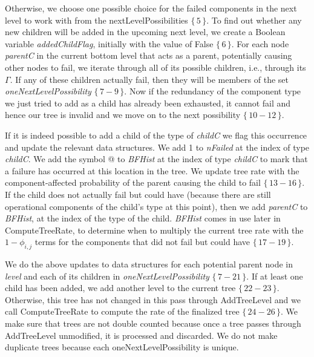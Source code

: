 \documentclass[12pt]{article}
\newcommand{\citeLine}[1]{$\{\,#1\,\}$}
\newcommand{\citeBlock}[2]{$\{\,#1 - #2\,\}$}
\begin{document}
 Otherwise, we choose one possible choice for the failed components in the next level to work with from the nextLevelPossibilities \citeLine{5}. To find out whether any new children will be added in the upcoming next level, we create a Boolean variable \textit{addedChildFlag}, initially with the value of False \citeLine{6}. For each node \textit{parentC} in the current bottom level that acts as a parent, potentially causing other nodes to fail, we iterate through all of its possible children, i.e., through its $\Gamma$. If any of these children actually fail, then they will be members of the set \textit{oneNextLevelPossibility} \citeBlock{7}{9}. Now if the redundancy of the component type we just tried to add as a child has already been exhausted, it cannot fail and hence our tree is invalid and we move on to the next possibility \citeBlock{10}{12}.

 If it is indeed possible to add a child of the type of \textit{childC} we flag this occurrence and update the relevant data structures. We add 1 to \textit{nFailed} at the index of type \textit{childC}. We add the symbol @ to \textit{BFHist} at the index of type \textit{childC} to mark that a failure has occurred at this location in the tree. We update tree rate with the component-affected probability of the parent causing the child to fail \citeBlock{13}{16}. If the child does not actually fail but could have (because there are still operational components of the child's type at this point), then we add \textit{parentC} to \textit{BFHist}, at the index of the type of the child. \textit{BFHist} comes in use later in ComputeTreeRate, to determine when to multiply the current tree rate with the $1-\phi_{i,j}$ terms for the components that did not fail but could have \citeBlock{17}{19}.

 We do the above updates to data structures for each potential parent node in \textit{level} and each of its children in \textit{oneNextLevelPossibility} \citeBlock{7}{21}. If at least one child has been added, we add another level to the current tree \citeBlock{22}{23}. Otherwise, this tree has not changed in this pass through AddTreeLevel and we call ComputeTreeRate to compute the rate of the finalized tree \citeBlock{24}{26}. We make sure that trees are not double counted because once a tree passes through AddTreeLevel unmodified, it is processed and discarded. We do not make duplicate trees because each oneNextLevelPossibility is unique.
\end{document}
